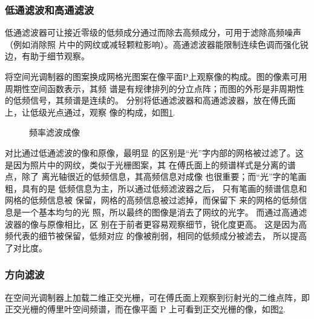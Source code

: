 \documentclass[10pt,a4paper,twoside,UTF8]{ctexart}
\begin{document}
\subsubsection{低通滤波和高通滤波}
低通滤波器可让接近零级的低频成分通过而除去高频成分，可用于滤除高频噪声（例如消除照
片中的网纹或减轻颗粒影响）。高通滤波器能限制连续色调而强化锐边，有助于细节观察。

将空间光调制器的图案换成网格光图案在像平面P上观察像的构成。图的像素可用周期性空间函数表示，其频
谱是有规律排列的分立点阵；而图的外形是非周期性的低频信号，其频谱是连续的。
分别将低通滤波器和高通滤波器，放在傅氏面上，让低级光点通过，观察
像的构成，如图\ref{fig:hl}.
\begin{figure}[H]
	\centering

	\caption{频率滤波成像}
	\label{fig:hl}
\end{figure}

对比通过低通滤波的像和原像，最明显
的区别是“光”字内部的网格被过滤了。这
是因为照片中的网纹，类似于光栅图案，其
在傅氏面上的频谱样式是分离的谱点，除了
离光轴很近的低频信息，其高频信息对成像
也很重要；而“光”字的笔画粗，具有的是
低频信息为主，所以通过低频滤波器之后，
只有笔画的频谱信息和网格的低频信息被
保留，网格的高频信息被过滤掉，而保留下
来的网格的低频信息是一个基本均匀的光
照，所以最终的图像是消去了网纹的光字。
而通过高通滤波器的像与原像相比，区
别在于前者更容易观察细节，锐化度更高。
这是因为高频代表的细节被保留，低频对应
的像被削弱，相同的低频成分被滤去，
所以提高了对比度。

\subsubsection{方向滤波}
在空间光调制器上加载二维正交光栅，可在傅氏面上观察到衍射光的二维点阵，即
正交光栅的傅里叶空间频谱，而在像平面 P 上可看到正交光栅的像，如图\ref{fig:dir_raw}.

\begin{figure}[H]
	\centering
	\caption{}
	\label{fig:dir_raw}
\end{figure}
\end{document}
